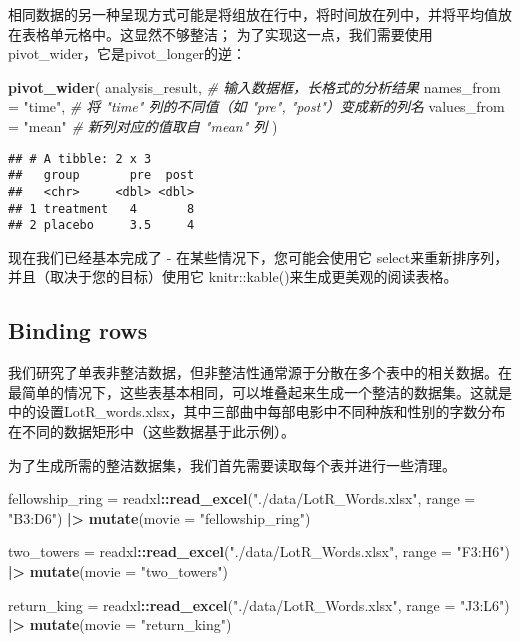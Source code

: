 \documentclass[
]{article}
\newenvironment{Shaded}{\begin{snugshade}}{\end{snugshade}}
\newcommand{\AttributeTok}[1]{\textcolor[rgb]{0.13,0.29,0.53}{#1}}
\newcommand{\CommentTok}[1]{\textcolor[rgb]{0.56,0.35,0.01}{\textit{#1}}}
\newcommand{\FunctionTok}[1]{\textcolor[rgb]{0.13,0.29,0.53}{\textbf{#1}}}
\newcommand{\NormalTok}[1]{#1}
\newcommand{\OtherTok}[1]{\textcolor[rgb]{0.56,0.35,0.01}{#1}}
\newcommand{\SpecialCharTok}[1]{\textcolor[rgb]{0.81,0.36,0.00}{\textbf{#1}}}
\newcommand{\StringTok}[1]{\textcolor[rgb]{0.31,0.60,0.02}{#1}}
\begin{document}
相同数据的另一种呈现方式可能是将组放在行中，将时间放在列中，并将平均值放在表格单元格中。这显然不够整洁；
为了实现这一点，我们需要使用 pivot\_wider，它是pivot\_longer的逆：

\begin{Shaded}
\begin{Highlighting}[]
\FunctionTok{pivot\_wider}\NormalTok{(}
\NormalTok{  analysis\_result,          }\CommentTok{\# 输入数据框，长格式的分析结果}
  \AttributeTok{names\_from =} \StringTok{"time"}\NormalTok{,      }\CommentTok{\# 将 "time" 列的不同值（如 "pre", "post"）变成新的列名}
  \AttributeTok{values\_from =} \StringTok{"mean"}      \CommentTok{\# 新列对应的值取自 "mean" 列}
\NormalTok{)}
\end{Highlighting}
\end{Shaded}

\begin{verbatim}
## # A tibble: 2 x 3
##   group       pre  post
##   <chr>     <dbl> <dbl>
## 1 treatment   4       8
## 2 placebo     3.5     4
\end{verbatim}

现在我们已经基本完成了 - 在某些情况下，您可能会使用它
select来重新排序列，并且（取决于您的目标）使用它
knitr::kable()来生成更美观的阅读表格。

\subsection{Binding rows}\label{binding-rows}

我们研究了单表非整洁数据，但非整洁性通常源于分散在多个表中的相关数据。在最简单的情况下，这些表基本相同，可以堆叠起来生成一个整洁的数据集。这就是中的设置LotR\_words.xlsx，其中三部曲中每部电影中不同种族和性别的字数分布在不同的数据矩形中（这些数据基于此示例）。

为了生成所需的整洁数据集，我们首先需要读取每个表并进行一些清理。

\begin{Shaded}
\begin{Highlighting}[]
\NormalTok{fellowship\_ring }\OtherTok{=} 
\NormalTok{  readxl}\SpecialCharTok{::}\FunctionTok{read\_excel}\NormalTok{(}\StringTok{"./data/LotR\_Words.xlsx"}\NormalTok{, }\AttributeTok{range =} \StringTok{"B3:D6"}\NormalTok{) }\SpecialCharTok{|\textgreater{}}
  \FunctionTok{mutate}\NormalTok{(}\AttributeTok{movie =} \StringTok{"fellowship\_ring"}\NormalTok{)}

\NormalTok{two\_towers }\OtherTok{=} 
\NormalTok{  readxl}\SpecialCharTok{::}\FunctionTok{read\_excel}\NormalTok{(}\StringTok{"./data/LotR\_Words.xlsx"}\NormalTok{, }\AttributeTok{range =} \StringTok{"F3:H6"}\NormalTok{) }\SpecialCharTok{|\textgreater{}}
  \FunctionTok{mutate}\NormalTok{(}\AttributeTok{movie =} \StringTok{"two\_towers"}\NormalTok{)}

\NormalTok{return\_king }\OtherTok{=} 
\NormalTok{  readxl}\SpecialCharTok{::}\FunctionTok{read\_excel}\NormalTok{(}\StringTok{"./data/LotR\_Words.xlsx"}\NormalTok{, }\AttributeTok{range =} \StringTok{"J3:L6"}\NormalTok{) }\SpecialCharTok{|\textgreater{}}
  \FunctionTok{mutate}\NormalTok{(}\AttributeTok{movie =} \StringTok{"return\_king"}\NormalTok{)}
\end{Highlighting}
\end{Shaded}
\end{document}
